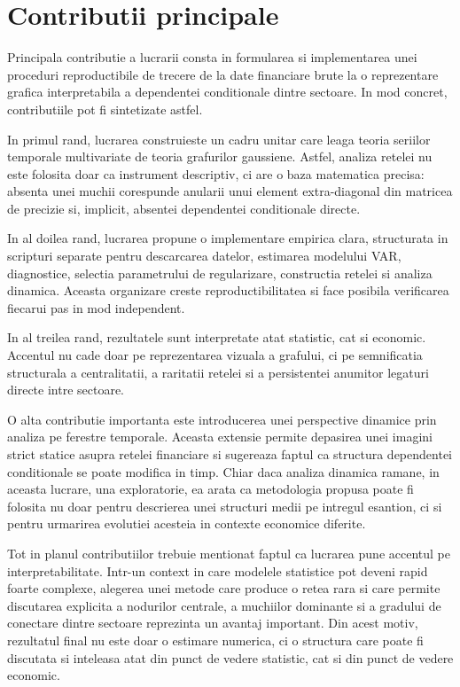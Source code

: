 \section{Contributii principale}

Principala contributie a lucrarii consta in formularea si implementarea unei
proceduri reproductibile de trecere de la date financiare brute la o reprezentare
grafica interpretabila a dependentei conditionale dintre sectoare. In mod
concret, contributiile pot fi sintetizate astfel.

In primul rand, lucrarea construieste un cadru unitar care leaga teoria
seriilor temporale multivariate de teoria grafurilor gaussiene. Astfel, analiza
retelei nu este folosita doar ca instrument descriptiv, ci are o baza
matematica precisa: absenta unei muchii corespunde anularii unui element
extra-diagonal din matricea de precizie si, implicit, absentei dependentei
conditionale directe.

In al doilea rand, lucrarea propune o implementare empirica clara, structurata
in scripturi separate pentru descarcarea datelor, estimarea modelului VAR,
diagnostice, selectia parametrului de regularizare, constructia retelei si
analiza dinamica. Aceasta organizare creste reproductibilitatea si face posibila
verificarea fiecarui pas in mod independent.

In al treilea rand, rezultatele sunt interpretate atat statistic, cat si
economic. Accentul nu cade doar pe reprezentarea vizuala a grafului, ci pe
semnificatia structurala a centralitatii, a raritatii retelei si a persistentei
anumitor legaturi directe intre sectoare.

O alta contributie importanta este introducerea unei perspective dinamice prin
analiza pe ferestre temporale. Aceasta extensie permite depasirea unei imagini
strict statice asupra retelei financiare si sugereaza faptul ca structura
dependentei conditionale se poate modifica in timp. Chiar daca analiza dinamica
ramane, in aceasta lucrare, una exploratorie, ea arata ca metodologia propusa
poate fi folosita nu doar pentru descrierea unei structuri medii pe intregul
esantion, ci si pentru urmarirea evolutiei acesteia in contexte economice diferite.

Tot in planul contributiilor trebuie mentionat faptul ca lucrarea pune accentul
pe interpretabilitate. Intr-un context in care modelele statistice pot deveni
rapid foarte complexe, alegerea unei metode care produce o retea rara si care
permite discutarea explicita a nodurilor centrale, a muchiilor dominante si a
gradului de conectare dintre sectoare reprezinta un avantaj important. Din acest
motiv, rezultatul final nu este doar o estimare numerica, ci o structura care
poate fi discutata si inteleasa atat din punct de vedere statistic, cat si din
punct de vedere economic.

